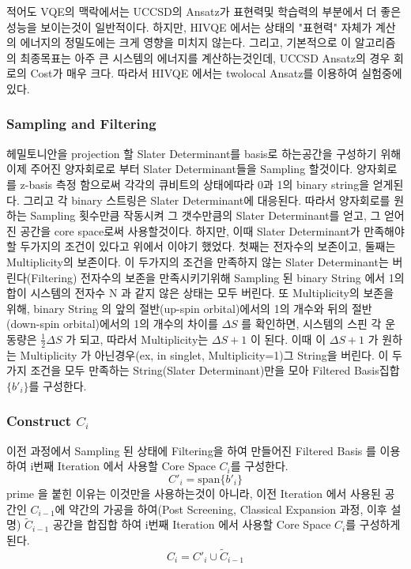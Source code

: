 \documentclass[10pt]{article}
\begin{document}
적어도 VQE의 맥락에서는 UCCSD의 Ansatz가 표현력및 학습력의 부분에서 더 좋은 성능을 보이는것이 일반적이다. 하지만, HIVQE 에서는 상태의 "표현력" 자체가 계산의 에너지의 정밀도에는 크게 영향을 미치지 않는다. 
그리고, 기본적으로 이 알고리즘의 최종목표는 아주 큰 시스템의 에너지를 계산하는것인데, UCCSD Ansatz의 경우 회로의 Cost가 매우 크다. 
따라서 HIVQE 에서는 twolocal Ansatz를 이용하여 실험중에 있다. 

\subsubsection{Sampling and Filtering}
헤밀토니안을 projection 할 Slater Determinant를 basis로 하는공간을 구성하기 위해 
이제 주어진 양자회로로 부터 Slater Determinant들을 Sampling 할것이다. 
양자회로를 z-basis 측정 함으로써 각각의 큐비트의 상태에따라 0과 1의 binary string을 얻게된다. 
그리고 각 binary 스트링은 Slater Determinant에 대응된다. 
따라서 양자회로를 원하는 Sampling 횟수만큼 작동시켜 그 갯수만큼의 Slater Determinant를 얻고, 그 얻어진 공간을 core space로써 사용할것이다. 
하지만, 이때 Slater Determinant가 만족해야할 두가지의 조건이 있다고 위에서 이야기 했었다.
첫째는 전자수의 보존이고, 둘째는 Multiplicity의 보존이다.
이 두가지의 조건을 만족하지 않는 Slater Determinant는 버린다(Filtering)
전자수의 보존을 만족시키기위해 Sampling 된 binary String 에서 1의 합이 시스템의 전자수 N 과 같지 않은 상태는 모두 버린다. 
또 Multiplicity의 보존을 위해, binary String 의 앞의 절반(up-spin orbital)에서의 1의 개수와 뒤의 절반(down-spin orbital)에서의 1의 개수의 차이를 \(\Delta S\) 를 확인하면,
시스템의 스핀 각 운동량은 \(\frac{1}{2}\Delta S\) 가 되고, 따라서 Multiplicity는 \(\Delta S + 1\) 이 된다. 
이때 이 \(\Delta S + 1\) 가 원하는 Multiplicity 가 아닌경우(ex, in singlet, Multiplicity=1)그 String을 버린다. 
이 두가지 조건을 모두 만족하는 String(Slater Determinant)만을 모아 Filtered Basis집합 \(\{b'_i\}\)를 구성한다. 

\subsubsection{Construct \(C_i\)}
이전 과정에서 Sampling 된 상태에 Filtering을 하여 만들어진 Filtered Basis 를 이용하여 i번째 Iteration 에서 사용할 Core Space \(C_i\)를 구성한다. 
\[
C'_i = \text{span}\{b'_i\}
\]
prime 을 붙힌 이유는 이것만을 사용하는것이 아니라, 이전 Iteration 에서 사용된 공간인 \(C_{i-1}\)에 약간의 가공을 하여(Post Screening, Classical Expansion 과정, 이후 설명) \(\tilde{C}_{i-1}\) 공간을 합집합 하여
i번째 Iteration 에서 사용할 Core Space \(C_i\)를 구성하게 된다. 
\[
C_i = C'_i \cup \tilde{C}_{i-1}
\]
\end{document}
